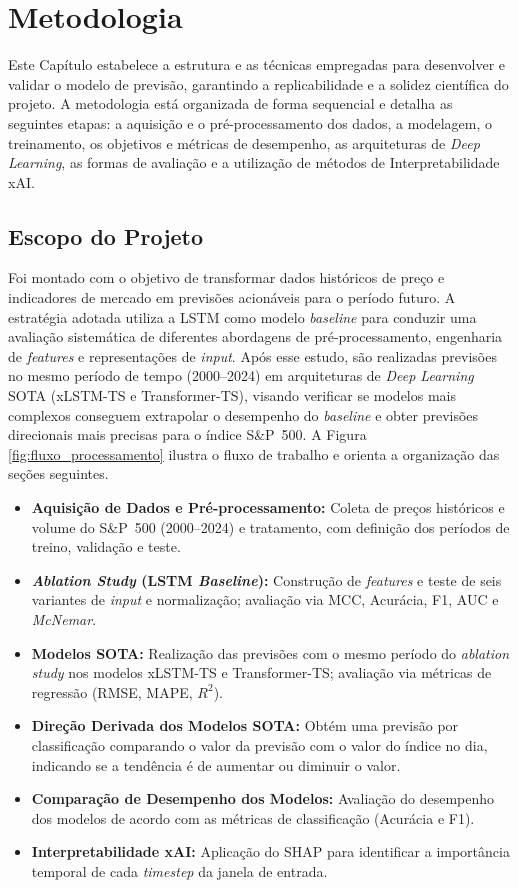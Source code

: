 \chapter[Metodologia]{Metodologia}

Este Capítulo estabelece a estrutura e as técnicas empregadas para desenvolver e validar o modelo de previsão, garantindo a replicabilidade e a solidez científica do projeto. A metodologia está organizada de forma sequencial e detalha as seguintes etapas: a aquisição e o pré-processamento dos dados, a modelagem, o treinamento, os objetivos e métricas de desempenho, as arquiteturas de \textit{Deep Learning}, as formas de avaliação e a utilização de métodos de Interpretabilidade xAI.


\section{Escopo do Projeto}

Foi montado com o objetivo de transformar dados históricos de preço e indicadores de mercado em previsões acionáveis para o período futuro. A estratégia adotada utiliza a LSTM como modelo \textit{baseline} para conduzir uma avaliação sistemática de diferentes abordagens de pré-processamento, engenharia de \textit{features} e representações de \textit{input}. Após esse estudo, são realizadas previsões no mesmo período de tempo (2000--2024) em arquiteturas de \textit{Deep Learning} SOTA (xLSTM-TS e Transformer-TS), visando verificar se modelos mais complexos conseguem extrapolar o desempenho do \textit{baseline} e obter previsões direcionais mais precisas para o índice S\&P~500. A Figura \ref{fig:fluxo_processamento} ilustra o fluxo de trabalho e orienta a organização das seções seguintes.

\begin{itemize}
    \item \textbf{Aquisição de Dados e Pré-processamento:} Coleta de preços históricos e volume do S\&P~500 (2000--2024) e tratamento, com definição dos períodos de treino, validação e teste.
    \item \textbf{\textit{Ablation Study} (LSTM \textit{Baseline}):} Construção de \textit{features} e teste de seis variantes de \textit{input} e normalização; avaliação via MCC, Acurácia, F1, AUC e \textit{McNemar}.
    \item \textbf{Modelos SOTA:} Realização das previsões com o mesmo período do \textit{ablation study} nos modelos xLSTM-TS e Transformer-TS; avaliação via métricas de regressão (RMSE, MAPE, $R^2$).
    \item \textbf{Direção Derivada dos Modelos SOTA:} Obtém uma previsão por classificação comparando o valor da previsão com o valor do índice no dia, indicando se a tendência é de aumentar ou diminuir o valor.
    \item \textbf{Comparação de Desempenho dos Modelos:} Avaliação do desempenho dos modelos de acordo com as métricas de classificação (Acurácia e F1).
    \item \textbf{Interpretabilidade xAI:} Aplicação do SHAP para identificar a importância temporal de cada \textit{timestep} da janela de entrada.
\end{itemize}

